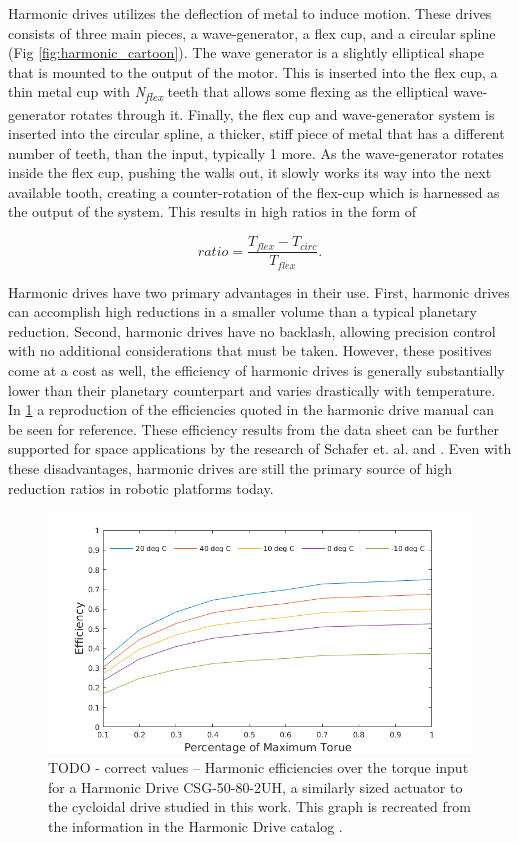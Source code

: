 Harmonic drives utilizes the deflection of metal to induce motion. These drives consists of three main pieces, a wave-generator, a flex cup, and a circular spline (Fig \ref{fig:harmonic_cartoon}). The wave generator is a slightly elliptical shape that is mounted to the output of the motor. This is inserted into the flex cup, a thin metal cup with \textit{N\textsubscript{flex}} teeth that allows some flexing as the elliptical wave-generator rotates through it. Finally, the flex cup and wave-generator system is inserted into the circular spline, a thicker, stiff piece of metal that has a different number of teeth,  than the input, typically 1 more. As the wave-generator rotates inside the flex cup, pushing the walls out, it slowly works its way into the next available tooth, creating a counter-rotation of the flex-cup which is harnessed as the output of the system. This results in high ratios in the form of 

\begin{equation} \label{eq:harmonic_ratio}
ratio = \frac{T_{flex} - T_{circ}} {T_{flex}}.
\end{equation}

Harmonic drives have two primary advantages in their use. First, harmonic drives can accomplish high reductions in a smaller volume than a typical planetary reduction. Second, harmonic drives have no backlash, allowing precision control with no additional considerations that must be taken. However, these positives come at a cost as well, the efficiency of harmonic drives is generally substantially lower than their planetary counterpart and varies drastically with temperature. In \ref{fig:harmonic_eff} a reproduction of the efficiencies quoted in the harmonic drive manual can be seen for reference. These efficiency results from the data sheet can be further supported for space applications by the research of Schafer et. al. \cite{ref:harmonic_space_lube} and \cite{ref:harmonic_performance}. Even with these disadvantages, harmonic drives are still the primary source of high reduction ratios in robotic platforms today. 

\begin{figure}[h]
   \centering
   \includegraphics[width=0.7\linewidth]{fig/harmonic_eff}
   \caption{TODO - correct values -- Harmonic efficiencies over the torque input for a Harmonic Drive CSG-50-80-2UH, a similarly sized actuator to the cycloidal drive studied in this work. This graph is recreated from the information in the Harmonic Drive catalog \cite{ref:harmonic_sheet}. }
   \label{fig:harmonic_eff}
\end{figure}

